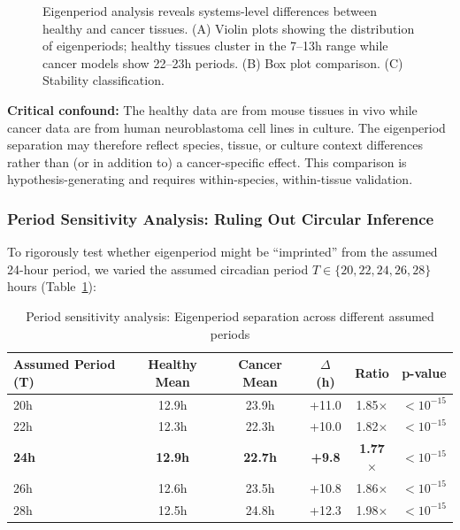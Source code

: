 \documentclass[11pt,a4paper]{article}
\begin{document}
\begin{figure}[H]
\centering
{}
\caption{Eigenperiod analysis reveals systems-level differences between healthy and cancer tissues. (A) Violin plots showing the distribution of eigenperiods; healthy tissues cluster in the 7--13h range while cancer models show 22--23h periods. (B) Box plot comparison. (C) Stability classification.}
\label{fig:eigenperiod}
\end{figure}

\textbf{Critical confound:} The healthy data are from mouse tissues in vivo while cancer data are from human neuroblastoma cell lines in culture. The eigenperiod separation may therefore reflect species, tissue, or culture context differences rather than (or in addition to) a cancer-specific effect. This comparison is hypothesis-generating and requires within-species, within-tissue validation.

\subsubsection*{Period Sensitivity Analysis: Ruling Out Circular Inference}

To rigorously test whether eigenperiod might be ``imprinted'' from the assumed 24-hour period, we varied the assumed circadian period $T \in \{20, 22, 24, 26, 28\}$ hours (Table~\ref{tab:period_sensitivity}):

\begin{table}[H]
\centering
\caption{Period sensitivity analysis: Eigenperiod separation across different assumed periods}
\label{tab:period_sensitivity}
\begin{tabular}{lccccl}
\toprule
Assumed Period (T) & Healthy Mean & Cancer Mean & $\Delta$ (h) & Ratio & p-value \\
\midrule
20h & 12.9h & 23.9h & +11.0 & 1.85$\times$ & $<10^{-15}$ \\
22h & 12.3h & 22.3h & +10.0 & 1.82$\times$ & $<10^{-15}$ \\
\textbf{24h} & \textbf{12.9h} & \textbf{22.7h} & \textbf{+9.8} & \textbf{1.77$\times$} & $<10^{-15}$ \\
26h & 12.6h & 23.5h & +10.8 & 1.86$\times$ & $<10^{-15}$ \\
28h & 12.5h & 24.8h & +12.3 & 1.98$\times$ & $<10^{-15}$ \\
\bottomrule
\end{tabular}
\end{table}
\end{document}

